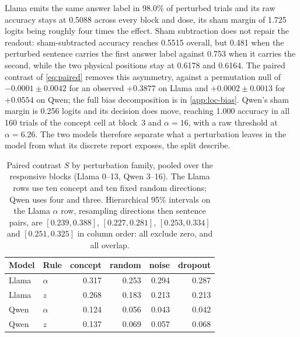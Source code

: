 Llama emits the same answer label in 98.0\% of perturbed trials and its raw
accuracy stays at 0.5088 across every block and dose, its sham margin of
1.725 logits being roughly four times the effect. Sham subtraction does not
repair the readout: sham-subtracted accuracy reaches 0.5515 overall, but
0.481 when the perturbed sentence carries the first answer label against
0.753 when it carries the second, while the two physical positions stay at
0.6178 and 0.6164. The paired contrast of \cref{eq:paired} removes this
asymmetry, against a permutation null of $-0.0001\pm0.0042$ for an observed
$+0.3877$ on Llama and $+0.0002\pm0.0013$ for $+0.0554$ on Qwen; the
full bias decomposition is in \cref{app:loc-bias}. Qwen's sham
margin is 0.256 logits and its decision does move, reaching 1.000 accuracy in
all 160 trials of the concept cell at block~3 and $\alpha=16$, with a raw
threshold at $\alpha=6.26$. The two models therefore separate what a
perturbation leaves in the model from what its discrete report exposes, the
split \citet{ferrara2026} describe.

\begin{table}[H]
\centering
\small
\begin{tabular}{llrrrr}
\toprule
Model & Rule & concept & random & noise & dropout \\
\midrule
Llama & $\alpha$ & 0.317 & 0.253 & 0.294 & 0.287 \\
Llama & $z$      & 0.268 & 0.183 & 0.213 & 0.213 \\
Qwen  & $\alpha$ & 0.124 & 0.056 & 0.043 & 0.042 \\
Qwen  & $z$      & 0.137 & 0.069 & 0.057 & 0.068 \\
\bottomrule
\end{tabular}
\caption{Paired contrast $S$ by perturbation family, pooled over the
responsive blocks (Llama 0--13, Qwen 3--16). The Llama rows use ten concept
and ten fixed random directions; Qwen uses four and three. Hierarchical 95\%
intervals on the Llama $\alpha$ row, resampling directions then sentence
pairs, are $[0.239,0.388]$, $[0.227,0.281]$, $[0.253,0.334]$ and
$[0.251,0.325]$ in column order: all exclude zero, and all overlap.}
\label{tab:localization}
\end{table}

